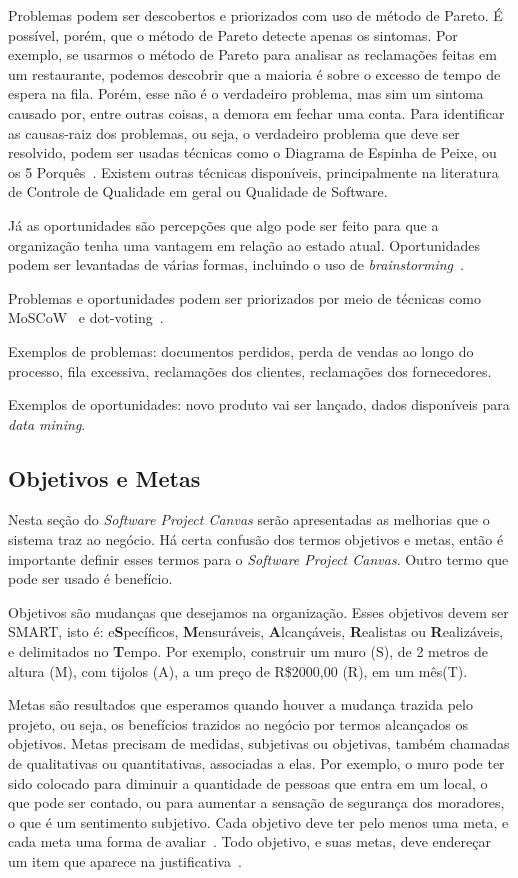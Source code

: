 \documentclass[a4]{report}
\begin{document}
Problemas podem ser descobertos e priorizados com uso de método de Pareto. É possível, porém, que o método de Pareto detecte apenas os sintomas. Por exemplo, se usarmos o método de Pareto para analisar as reclamações feitas em um restaurante, podemos descobrir que a maioria é sobre o excesso de tempo de espera na fila. Porém, esse não é o verdadeiro problema, mas sim um sintoma causado por, entre outras coisas, a demora em fechar uma conta. Para identificar as causas-raiz dos problemas, ou seja, o verdadeiro problema que deve ser resolvido, podem ser usadas técnicas como o Diagrama de Espinha de Peixe, ou os 5 Porquês~\citep{gray:2010}. Existem outras técnicas disponíveis, principalmente na literatura de Controle de Qualidade em geral ou Qualidade de Software.

Já as oportunidades são percepções que algo pode ser feito para que a organização tenha uma vantagem em relação ao estado atual. Oportunidades podem ser levantadas de várias formas, incluindo o uso de \textit{brainstorming}~\citep{tracy:2015}.

Problemas e oportunidades podem ser priorizados por meio de técnicas como MoSCoW~\citep{dsdm:2nd} e dot-voting~\citep{gray:2010}.

Exemplos de problemas: documentos perdidos, perda de vendas ao longo do processo, fila excessiva, reclamações dos clientes, reclamações dos fornecedores.

Exemplos de oportunidades: novo produto vai ser lançado, dados disponíveis para \textit{data mining}.


\subsection{Objetivos e Metas}

Nesta seção do \textit{Software Project Canvas} serão apresentadas as melhorias que o sistema traz ao negócio. Há certa confusão dos termos objetivos e metas, então é importante definir esses termos para o \textit{Software Project Canvas}. Outro termo que pode ser usado é benefício.

Objetivos são mudanças que desejamos na organização. Esses objetivos devem ser SMART, isto é: e\textbf{S}pecíficos, \textbf{M}ensuráveis, \textbf{A}lcançáveis, \textbf{R}ealistas ou \textbf{R}ealizáveis, e delimitados no \textbf{T}empo. Por exemplo, construir um muro (S), de 2 metros de altura (M), com tijolos (A), a um preço de R\$2000,00 (R), em um mês(T).

Metas são resultados que esperamos quando houver a mudança trazida pelo projeto, ou seja, os benefícios trazidos ao negócio por termos alcançados os objetivos. Metas precisam de medidas, subjetivas ou objetivas, também chamadas de qualitativas ou quantitativas, associadas a elas. Por exemplo, o muro pode ter sido colocado para diminuir a quantidade de pessoas que entra em um local, o que pode ser contado, ou para aumentar a sensação de segurança dos moradores, o que é um sentimento subjetivo. Cada objetivo deve ter pelo menos uma meta, e cada meta uma forma de avaliar~\citep{ruble_practical_1997}.
Todo objetivo, e suas metas, deve endereçar um item que aparece na justificativa~\citep{finocchio:2013}.
\end{document}
